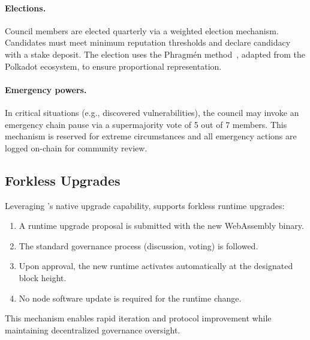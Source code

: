 \paragraph{Elections.} Council members are elected quarterly via a weighted election mechanism. Candidates must meet minimum reputation thresholds and declare candidacy with a stake deposit. The election uses the Phragm\'{e}n method~\citep{phragmen2019}, adapted from the Polkadot ecosystem, to ensure proportional representation.

\paragraph{Emergency powers.} In critical situations (e.g., discovered vulnerabilities), the council may invoke an emergency chain pause via a supermajority vote of 5 out of 7 members. This mechanism is reserved for extreme circumstances and all emergency actions are logged on-chain for community review.

\subsection{Forkless Upgrades}

Leveraging \substrate{}'s native upgrade capability, \claw{} supports forkless runtime upgrades:

\begin{enumerate}[nosep]
    \item A runtime upgrade proposal is submitted with the new WebAssembly binary.
    \item The standard governance process (discussion, voting) is followed.
    \item Upon approval, the new runtime activates automatically at the designated block height.
    \item No node software update is required for the runtime change.
\end{enumerate}

\noindent This mechanism enables rapid iteration and protocol improvement while maintaining decentralized governance oversight.
